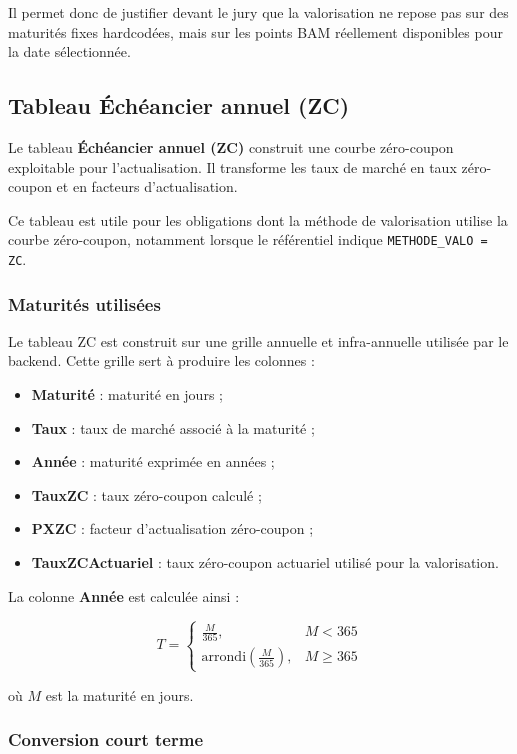 \documentclass[12pt,a4paper]{article}
\begin{document}
Il permet donc de justifier devant le jury que la valorisation ne repose pas sur des maturités fixes hardcodées, mais sur les points BAM réellement disponibles pour la date sélectionnée.

\subsection{Tableau Échéancier annuel (ZC)}

Le tableau \textbf{Échéancier annuel (ZC)} construit une courbe zéro-coupon exploitable pour l'actualisation. Il transforme les taux de marché en taux zéro-coupon et en facteurs d'actualisation.

Ce tableau est utile pour les obligations dont la méthode de valorisation utilise la courbe zéro-coupon, notamment lorsque le référentiel indique \texttt{METHODE\_VALO = ZC}.

\subsubsection*{Maturités utilisées}

Le tableau ZC est construit sur une grille annuelle et infra-annuelle utilisée par le backend. Cette grille sert à produire les colonnes :

\begin{itemize}
    \item \textbf{Maturité} : maturité en jours ;
    \item \textbf{Taux} : taux de marché associé à la maturité ;
    \item \textbf{Année} : maturité exprimée en années ;
    \item \textbf{TauxZC} : taux zéro-coupon calculé ;
    \item \textbf{PXZC} : facteur d'actualisation zéro-coupon ;
    \item \textbf{TauxZCActuariel} : taux zéro-coupon actuariel utilisé pour la valorisation.
\end{itemize}

La colonne \textbf{Année} est calculée ainsi :

\[
T =
\begin{cases}
\frac{M}{365}, & M < 365 \\
\text{arrondi}\left(\frac{M}{365}\right), & M \geq 365
\end{cases}
\]

où $M$ est la maturité en jours.

\subsubsection*{Conversion court terme}
\end{document}
